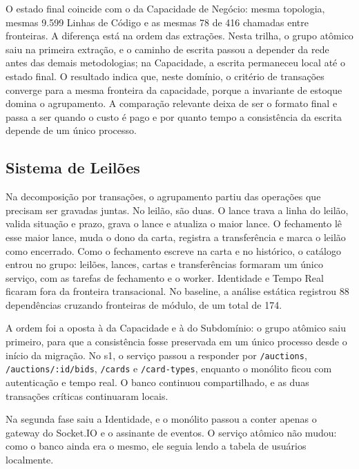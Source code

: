 O estado final coincide com o da Capacidade de Negócio: mesma topologia, mesmas 9.599 Linhas de Código e as mesmas 78 de 416 chamadas entre fronteiras. A diferença está na ordem das extrações. Nesta trilha, o grupo atômico saiu na primeira extração, e o caminho de escrita passou a depender da rede antes das demais metodologias; na Capacidade, a escrita permaneceu local até o estado final. O resultado indica que, neste domínio, o critério de transações converge para a mesma fronteira da capacidade, porque a invariante de estoque domina o agrupamento. A comparação relevante deixa de ser o formato final e passa a ser quando o custo é pago e por quanto tempo a consistência da escrita depende de um único processo.





\subsection*{Sistema de Leilões}

Na decomposição por transações, o agrupamento partiu das operações que precisam ser gravadas juntas. No leilão, são duas. O lance trava a linha do leilão, valida situação e prazo, grava o lance e atualiza o maior lance. O fechamento lê esse maior lance, muda o dono da carta, registra a transferência e marca o leilão como encerrado. Como o fechamento escreve na carta e no histórico, o catálogo entrou no grupo: leilões, lances, cartas e transferências formaram um único serviço, com as tarefas de fechamento e o worker. Identidade e Tempo Real ficaram fora da fronteira transacional. No baseline, a análise estática registrou 88 dependências cruzando fronteiras de módulo, de um total de 174.

A ordem foi a oposta à da Capacidade e à do Subdomínio: o grupo atômico saiu primeiro, para que a consistência fosse preservada em um único processo desde o início da migração. No s1, o serviço passou a responder por \texttt{/auctions}, \texttt{/auctions/:id/bids}, \texttt{/cards} e \texttt{/card-types}, enquanto o monólito ficou com autenticação e tempo real. O banco continuou compartilhado, e as duas transações críticas continuaram locais.

Na segunda fase saiu a Identidade, e o monólito passou a conter apenas o gateway do Socket.IO e o assinante de eventos. O serviço atômico não mudou: como o banco ainda era o mesmo, ele seguia lendo a tabela de usuários localmente.


